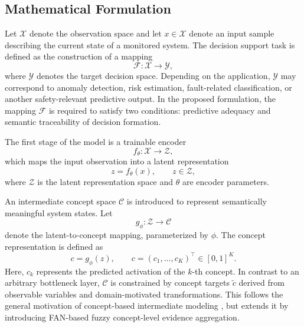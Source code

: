 \documentclass[runningheads]{llncs}
\begin{document}
\subsection{Mathematical Formulation}

Let $\mathcal{X}$ denote the observation space and let $x \in \mathcal{X}$ denote an input sample describing the current state of a monitored system. The decision support task is defined as the construction of a mapping
\begin{equation}
\mathcal{F} : \mathcal{X} \rightarrow \mathcal{Y},
\end{equation}
where $\mathcal{Y}$ denotes the target decision space. Depending on the application, $\mathcal{Y}$ may correspond to anomaly detection, risk estimation, fault-related classification, or another safety-relevant predictive output. In the proposed formulation, the mapping $\mathcal{F}$ is required to satisfy two conditions: predictive adequacy and semantic traceability of decision formation.

The first stage of the model is a trainable encoder
\begin{equation}
f_{\theta} : \mathcal{X} \rightarrow \mathcal{Z},
\end{equation}
which maps the input observation into a latent representation
\begin{equation}
z = f_{\theta}(x), \qquad z \in \mathcal{Z},
\end{equation}
where $\mathcal{Z}$ is the latent representation space and $\theta$ are encoder parameters.

An intermediate concept space $\mathcal{C}$ is introduced to represent semantically meaningful system states. Let
\begin{equation}
g_{\phi} : \mathcal{Z} \rightarrow \mathcal{C}
\end{equation}
denote the latent-to-concept mapping, parameterized by $\phi$. The concept representation is defined as
\begin{equation}
c = g_{\phi}(z), \qquad c = (c_{1}, \dots, c_{K})^{\top} \in [0,1]^K.
\end{equation}
Here, $c_k$ represents the predicted activation of the $k$-th concept. In contrast to an arbitrary bottleneck layer, $\mathcal{C}$ is constrained by concept targets $\tilde{c}$ derived from observable variables and domain-motivated transformations. This follows the general motivation of concept-based intermediate modeling \cite{koh2020cbm}, but extends it by introducing FAN-based fuzzy concept-level evidence aggregation.
\end{document}
